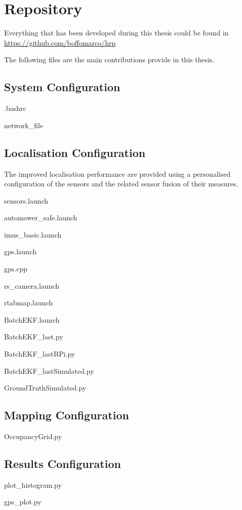 \chapter{Repository}
\noindent
Everything that has been developed during this thesis could be found in \url{https://github.com/boffomarco/hrp}

The following files are the main contributions provide in this thesis.

\section{System Configuration}
\noindent


.bashrc

network\_file 

\section{Localisation Configuration}
\noindent The improved localisation performance are provided using a personalised configuration of the sensors and the related sensor fusion of their measures.

sensors.launch

automower\_safe.launch

imus\_basic.launch

gps.launch

gps.cpp

rs\_camera.launch

rtabmap.launch

BatchEKF.launch

BatchEKF\_last.py

BatchEKF\_lastRPi.py

BatchEKF\_lastSimulated.py

GroundTruthSimulated.py

\section{Mapping Configuration}
\noindent

OccupancyGrid.py

\section{Results Configuration}
\noindent

plot\_histogram.py

gps\_plot.py



